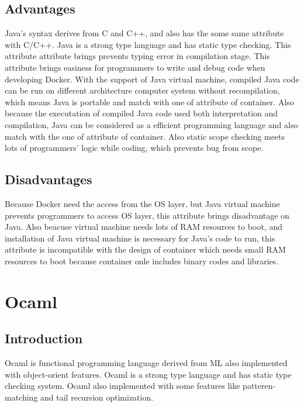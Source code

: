 \documentclass[10pt, a4paper]{IEEEtran}
\begin{document}
    \subsection*{Advantages}
    Java's syntax derives from C and C++, and also has the some same attribute with C/C++. Java is a strong type language and has static type checking. This attribute attribute brings prevents typing error in compilation stage. This attribute brings easiness for programmers to write and debug code when developing Docker.  With the support of Java virtual machine, compiled Java code can be run on different architecture computer system without recompilation, which means Java is portable and match with one of attribute of container. Also because the executation of compiled Java code used both interpretation and compilation, Java can be considered as a efficient programming language and also match with the one of attribute of container. Also static scope checking meets lots of programmers' logic while coding, which prevents bug from scope.\\
    \subsection*{Disadvantages}
    Because Docker need the access from the OS layer, but Java virtual machine prevents programmers to access OS layer, this attribute brings disadvantage on Java. Also beacuse virtual machine needs lots of RAM resources to boot, and installation of Java virtual machine is necessary for Java's code to run, this attribute is incompatible with the design of container which needs small RAM resources to boot because container onle includes binary codes and libraries.\\

    \section{Ocaml}
    \subsection*{Introduction}
    Ocaml is functional programming language derived from ML also implemented with object-orient features. Ocaml is a strong type language and has static type checking system. Ocaml also implemented with some features like patteren-matching and tail recursion optimization.\\
\end{document}
